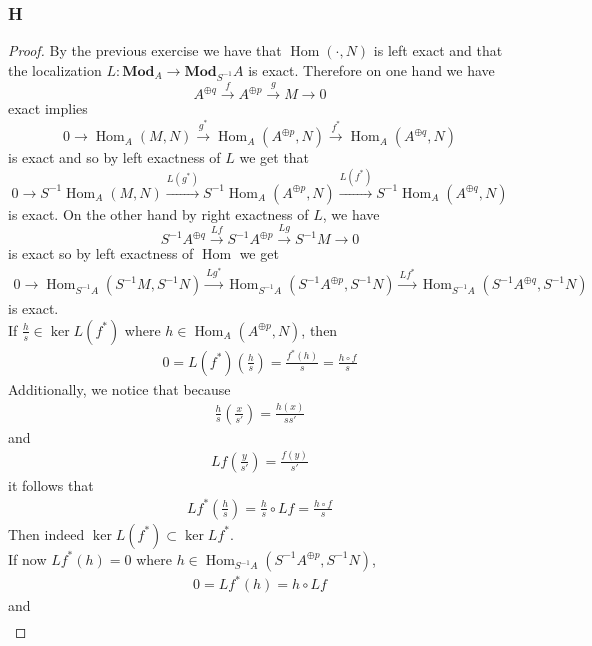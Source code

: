 \documentclass{article}
\DeclareMathOperator{\Hom}{Hom}
\newcommand{\Mod}{\mathbf{Mod}} %
\begin{document}
\subsubsection{H}\label{1.6.H}
\begin{proof}
    By the previous exercise we have that $\Hom(\cdot,N)$ is left exact and that the localization $L:\Mod_A \to \Mod_{S^{-1}}A$ is exact. Therefore on one hand we have
    \[
    A^{\oplus q} \xrightarrow{f} A^{\oplus p}\xrightarrow{g} M\rightarrow 0
    \]
    exact implies
    \[
    0\rightarrow \Hom_A(M,N)\xrightarrow{g^*} \Hom_A(A^{\oplus p},N)\xrightarrow{f^*} \Hom_A(A^{\oplus q},N)
    \]
    is exact and so by left exactness of $L$ we get that
    \[
    0\rightarrow S^{-1}\Hom_A(M,N)\xrightarrow{L(g^*)} S^{-1}\Hom_A(A^{\oplus p},N) \xrightarrow{L(f^*)} S^{-1}\Hom_A(A^{\oplus q},N)
    \]
    is exact. On the other hand by right exactness of $L$, we have
    \[
    S^{-1}A^{\oplus q} \xrightarrow{Lf} S^{-1}A^{\oplus p} \xrightarrow{Lg} S^{-1}M \rightarrow0
    \]
    is exact so by left exactness of $\Hom$ we get
    \begin{align*}
        0\rightarrow \Hom_{S^{-1}A}(S^{-1}M,S^{-1}N) \xrightarrow{Lg^*} \Hom_{S^{-1}A}(S^{-1}A^{\oplus p},S^{-1}N)\xrightarrow{Lf^*} \Hom_{S^{-1}A}(S^{-1}A^{\oplus q},S^{-1}N)
    \end{align*}
    is exact.\\
    If $\frac{h}{s}\in \ker L(f^*)$ where $h\in \Hom_A(A^{\oplus p},N)$, then
    \begin{align*}
        0=L(f^*)(\frac{h}{s})=\frac{f^*(h)}{s}=\frac{h\circ f}{s}
    \end{align*}
    Additionally, we notice that because
    \begin{align*}
        \frac{h}{s}(\frac{x}{s'})=\frac{h(x)}{ss'}
    \end{align*}
    and
    \begin{align*}
        Lf(\frac{y}{s'})=\frac{f(y)}{s'}
    \end{align*}
    it follows that
    \begin{align*}
        Lf^*(\frac{h}{s})=\frac{h}{s}\circ Lf=\frac{h\circ f}{s}
    \end{align*}
    Then indeed $\ker L(f^*)\subset \ker Lf^*$.\\
    If now $Lf^*(h)=0$ where $h\in \Hom_{S^{-1}A}(S^{-1}A^{\oplus p},S^{-1}N)$,
    \begin{align*}
        0=Lf^*(h)=h\circ Lf
    \end{align*}
    and
    \begin{align*}

\end{align*}
\end{proof}
\end{document}
